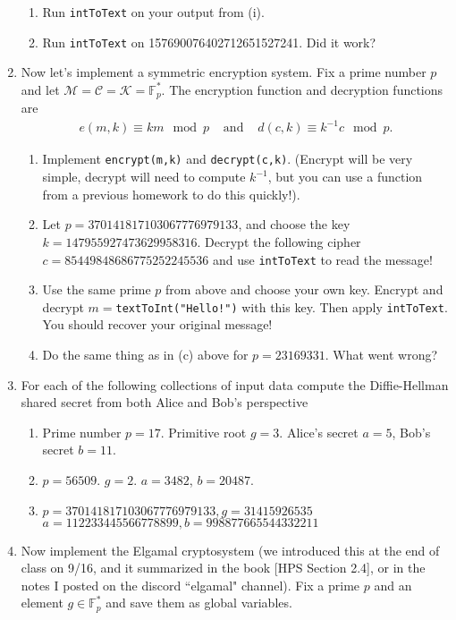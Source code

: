 \documentclass[11pt]{article}
\newcommand{\bF}{\mathbb{F}}
\newcommand{\cC}{\mathcal{C}}
\newcommand{\cK}{\mathcal{K}}
\newcommand{\cM}{\mathcal{M}}
\begin{document}
\begin{enumerate}
{\begin{enumerate}
{\begin{enumerate}
      \item{Run \verb|intToText| on your output from (i).}
      \item{Run \verb|intToText| on 157690076402712651527241.  Did it work?}
    \end{enumerate}
    }
  \end{enumerate}
  }
  \item{
  Now let's implement a symmetric encryption system.  Fix a prime number $p$ and let $\cM = \cC = \cK = \bF_p^*$.  The encryption function and decryption functions are
  \begin{eqnarray*}
    e(m,k)\equiv km\mod p&\text{    and    }&d(c,k)\equiv k^{-1}c\mod p.
  \end{eqnarray*}
  \begin{enumerate}
    \item{
    Implement \verb|encrypt(m,k)| and \verb|decrypt(c,k)|.  (Encrypt will be very simple, decrypt will need to compute $k^{-1}$, but you can use a function from a previous homework to do this quickly!).
    }
    \item{
     Let $p = 370141817103067776979133$, and choose the key $k=147955927473629958316$.  Decrypt the following cipher $c=85449848686775252245536$ and use \verb|intToText| to read the message!
    }
    \item{
    Use the same prime $p$ from above and choose your own key.  Encrypt and decrypt $m=$\verb|textToInt("Hello!")| with this key.  Then apply \verb|intToText|.  You should recover your original message!
    }
    \item{
    Do the same thing as in (c) above for $p=23169331$.  What went wrong?
    }
  \end{enumerate}
  }
  \item{For each of the following collections of input data compute the Diffie-Hellman shared secret from both Alice and Bob's perspective
  \begin{enumerate}
    \item{
    Prime number $p = 17$.  Primitive root $g=3$.  Alice's secret $a=5$, Bob's secret $b = 11$.
    }
    \item{
    $p = 56509$.  $g=2$. $a = 3482$, $b=20487$.
    }
    \item{
    $p = 370141817103067776979133,g=31415926535$\\
    $a = 112233445566778899,b=998877665544332211$
    }
  \end{enumerate}
  }
  \item{
  Now implement the Elgamal cryptosystem (we introduced this at the end of class on 9/16, and it summarized in the book [HPS Section 2.4], or in the notes I posted on the discord ``elgamal" channel).  Fix a prime $p$ and an element $g\in\bF_p^*$ and save them as global variables.
}
\end{enumerate}
\end{document}
